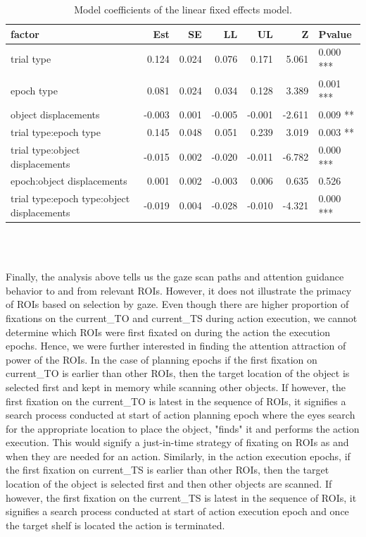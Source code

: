 \begin{table}
\begin{tabular}{lrrrrrl}
\toprule
                                     factor &    Est &    SE &     LL &     UL &      Z &  Pvalue \\
\midrule
                        trial type &  0.124 & 0.024 &  0.076 &  0.171 &  5.061 &   0.000 *** \\
                              epoch type &  0.081 & 0.024 &  0.034 &  0.128 &  3.389 &   0.001  ***\\
                                  object displacements & -0.003 & 0.001 & -0.005 & -0.001 & -2.611 &   0.009 ** \\
           trial type:epoch type &  0.145 & 0.048 &  0.051 &  0.239 &  3.019 &   0.003  **\\
               trial type:object displacements & -0.015 & 0.002 & -0.020 & -0.011 & -6.782 &   0.000 *** \\
                    epoch:object displacements &  0.001 & 0.002 & -0.003 &  0.006 &  0.635 &   0.526        \\
 trial type:epoch type:object displacements & -0.019 & 0.004 & -0.028 & -0.010 & -4.321 &   0.000 *** \\
\bottomrule
\end{tabular}
\\\\
\caption{\label{tab:lm_res}Model coefficients of the linear fixed effects model.}
\end{table}


Finally, the analysis above tells us the gaze scan paths and attention guidance behavior to and from relevant ROIs. However, it does not illustrate the primacy of ROIs based on selection by gaze. Even though there are higher proportion of fixations on the current\_TO and current\_TS during action execution, we cannot determine which ROIs were first fixated on during the action the execution epochs. Hence, we were further interested in finding the attention attraction of power of the ROIs. In the case of planning epochs if the first fixation on current\_TO is earlier than other ROIs, then the target location of the object is selected first and kept in memory while scanning other objects. If however, the first fixation on the current\_TO is latest in the sequence of ROIs, it signifies a search process conducted at start of action planning epoch where the eyes search for the appropriate location to place the object, "finds" it and performs the action execution. This would signify a just-in-time strategy of fixating on ROIs as and when they are needed for an action. Similarly, in the action execution epochs, if the first fixation on current\_TS is earlier than other ROIs, then the target location of the object is selected first and then other objects are scanned. If however, the first fixation on the current\_TS is latest in the sequence of ROIs, it signifies a search process conducted at start of action execution epoch and once the target shelf is located the action is terminated. 

